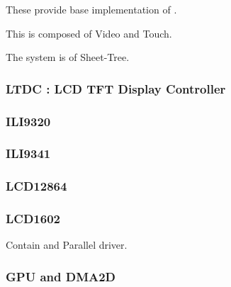 

These provide base implementation of .

This is composed of Video and Touch.

The system is of Sheet-Tree.

\subsubsection{LTDC : LCD TFT Display Controller}

\subsubsection{ILI9320}
\subsubsection{ILI9341}
\subsubsection{LCD12864}
\subsubsection{LCD1602}

Contain  and {Parallel} driver.

\subsubsection{GPU and DMA2D}


